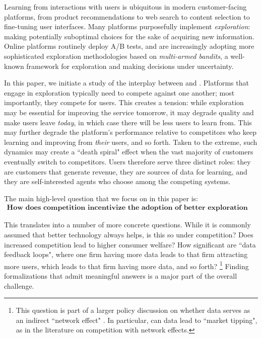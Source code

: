 
Learning from interactions with users is ubiquitous in modern customer-facing platforms, from product recommendations to web search to content selection to fine-tuning user interfaces. Many platforms purposefully implement \emph{exploration}: making potentially suboptimal choices for the sake of acquiring new information.
Online platforms routinely deploy A/B tests, and are increasingly adopting  more sophisticated exploration methodologies based on \emph{multi-armed bandits}, a well-known framework for exploration and making decisions under uncertainty.



In this paper, we initiate a study of the interplay between \exploration and \competition. Platforms that engage in exploration typically need to compete against one another; most importantly, they compete for users. This creates a tension:
while exploration may be essential for improving the service tomorrow, it may degrade quality and make users leave \emph{today}, in which case there will be less users to learn from. This may further degrade the platform's performance relative to competitors who keep learning and improving from \emph{their} users, and so forth. Taken to the extreme, such dynamics may create a ``death spiral" effect when the vast majority of customers eventually switch to competitors. Users therefore serve three distinct roles: they are customers that generate revenue, they are sources of data for learning, and they are self-interested agents who choose among the competing systems.

The main high-level question that we focus on in this paper is: 
\begin{align*}
\textbf{How does competition incentivize the adoption of better exploration algorithms?}
\end{align*}

\noindent This translates into a number of more concrete questions. While it is commonly assumed that better technology always helps, is this so under competition? Does increased competition lead to higher consumer welfare? How significant are ``data feedback loops", where one firm having more data leads to that firm attracting more users, which leads to that firm having more data, and so forth?%
\footnote{This question is part of a larger policy discussion on whether data serves as an indirect ``network effect" \citep[\eg see][]{jullien2019economics}. In particular, can data lead to ``market tipping", as in the literature on competition with network effects.}
Finding formalizations that admit meaningful answers is a major part of the overall challenge.
 

